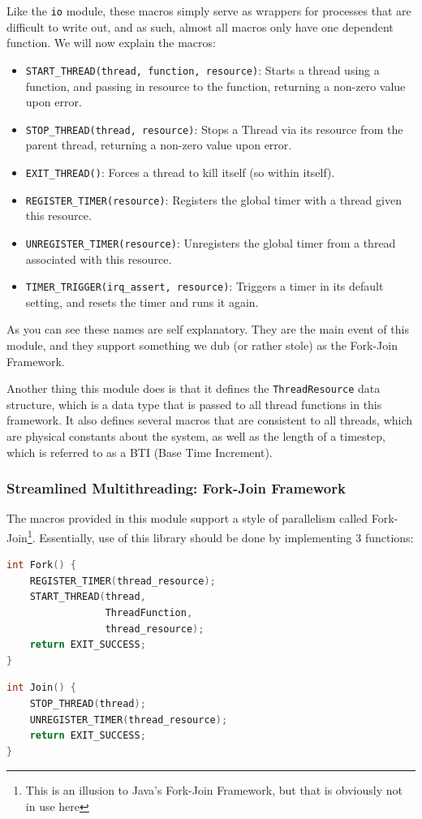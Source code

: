 \documentclass[letterpaper]{article}
\begin{document}
Like the \texttt{io} module, these macros simply serve as wrappers for processes that are difficult to write out, and as such, almost all macros only have one dependent function. We will now explain the macros:
\begin{itemize}
    \item \texttt{START\_THREAD(thread, function, resource)}: Starts a thread using a function, and passing in resource to the function, returning a non-zero value upon error.
    \item \texttt{STOP\_THREAD(thread, resource)}: Stops a Thread via its resource from the parent thread, returning a non-zero value upon error.
    \item \texttt{EXIT\_THREAD()}: Forces a thread to kill itself (so within itself).
    \item \texttt{REGISTER\_TIMER(resource)}: Registers the global timer with a thread given this resource.
    \item \texttt{UNREGISTER\_TIMER(resource)}: Unregisters the global timer from a thread associated with this resource.
    \item \texttt{TIMER\_TRIGGER(irq\_assert, resource)}: Triggers a timer in its default setting, and resets the timer and runs it again.
\end{itemize}

As you can see these names are self explanatory. They are the main event of this module, and they support something we dub (or rather stole) as the Fork-Join Framework.

Another thing this module does is that it defines the \texttt{ThreadResource} data structure, which is a data type that is passed to all thread functions in this framework. It also defines several macros that are consistent to all threads, which are physical constants about the system, as well as the length of a timestep, which is referred to as a BTI (Base Time Increment).

\newpage

\subsubsection{Streamlined Multithreading: Fork-Join Framework}
The macros provided in this module support a style of parallelism called Fork-Join\footnote{This is an illusion to Java's Fork-Join Framework, but that is obviously not in use here}. Essentially, use of this library should be done by implementing 3 functions:

\begin{multicols}{2}
    \begin{lstlisting}[language=C]
int Fork() {
    REGISTER_TIMER(thread_resource);
    START_THREAD(thread,
                 ThreadFunction,
                 thread_resource);
    return EXIT_SUCCESS;
}
    \end{lstlisting}
    \columnbreak
    \begin{lstlisting}[language=C]
int Join() {
    STOP_THREAD(thread);
    UNREGISTER_TIMER(thread_resource);
    return EXIT_SUCCESS;
}
    \end{lstlisting}
    
\end{multicols}
\end{document}

